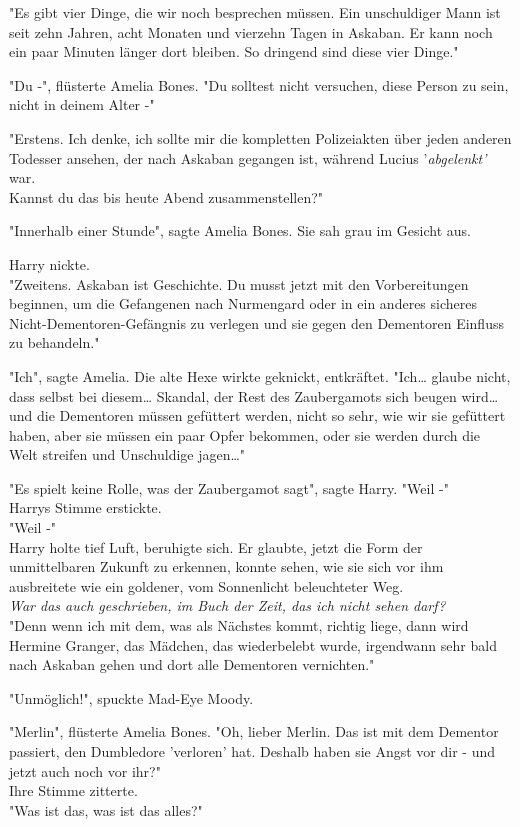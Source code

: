 {"Es gibt vier Dinge, die wir noch besprechen müssen. Ein unschuldiger Mann ist seit zehn Jahren, acht Monaten und vierzehn Tagen in Askaban. Er kann noch ein paar Minuten länger dort bleiben. So dringend sind diese vier Dinge."

"Du -", flüsterte Amelia Bones. "Du solltest nicht versuchen, diese Person zu sein, nicht in deinem Alter -"

"Erstens. Ich denke, ich sollte mir die kompletten Polizeiakten über jeden anderen Todesser ansehen, der nach Askaban gegangen ist, während Lucius '\emph{abgelenkt'} war.\\ Kannst du das bis heute Abend zusammenstellen?"

"Innerhalb einer Stunde", sagte Amelia Bones. Sie sah grau im Gesicht aus.

Harry nickte.\\ "Zweitens. Askaban ist Geschichte. Du musst jetzt mit den Vorbereitungen beginnen, um die Gefangenen nach Nurmengard oder in ein anderes sicheres Nicht-Dementoren-Gefängnis zu verlegen und sie gegen den Dementoren Einfluss zu behandeln."

"Ich", sagte Amelia. Die alte Hexe wirkte geknickt, entkräftet. "Ich… glaube nicht, dass selbst bei diesem… Skandal, der Rest des Zaubergamots sich beugen wird… und die Dementoren müssen gefüttert werden, nicht so sehr, wie wir sie gefüttert haben, aber sie müssen ein paar Opfer bekommen, oder sie werden durch die Welt streifen und Unschuldige jagen…"

"Es spielt keine Rolle, was der Zaubergamot sagt", sagte Harry. "Weil -"\\ Harrys Stimme erstickte.\\ "Weil -"\\ Harry holte tief Luft, beruhigte sich. Er glaubte, jetzt die Form der unmittelbaren Zukunft zu erkennen, konnte sehen, wie sie sich vor ihm ausbreitete wie ein goldener, vom Sonnenlicht beleuchteter Weg.\\ \emph{War das auch geschrieben, im Buch der Zeit, das ich nicht sehen darf?}\\ "Denn wenn ich mit dem, was als Nächstes kommt, richtig liege, dann wird Hermine Granger, das Mädchen, das wiederbelebt wurde, irgendwann sehr bald nach Askaban gehen und dort alle Dementoren vernichten."

"Unmöglich!", spuckte Mad-Eye Moody.

"Merlin", flüsterte Amelia Bones. "Oh, lieber Merlin. Das ist mit dem Dementor passiert, den Dumbledore 'verloren' hat. Deshalb haben sie Angst vor dir - und jetzt auch noch vor ihr?"\\ Ihre Stimme zitterte.\\ "Was ist das, was ist das alles?"

}
